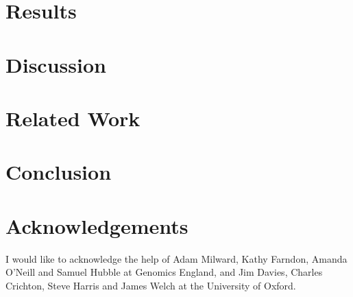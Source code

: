 \documentclass[runningheads]{llncs}
\begin{document}
%
%
%
%



	

	\section{Results}
	\section{Discussion}
	\section{Related Work}
	\section{Conclusion}
	
	
	
	\section{Acknowledgements}
	I would like to acknowledge the help of Adam Milward, Kathy Farndon, Amanda O'Neill and Samuel Hubble at Genomics England, and Jim Davies, Charles Crichton, Steve Harris and James Welch at the University of Oxford.
%	



	
	
\end{document}
